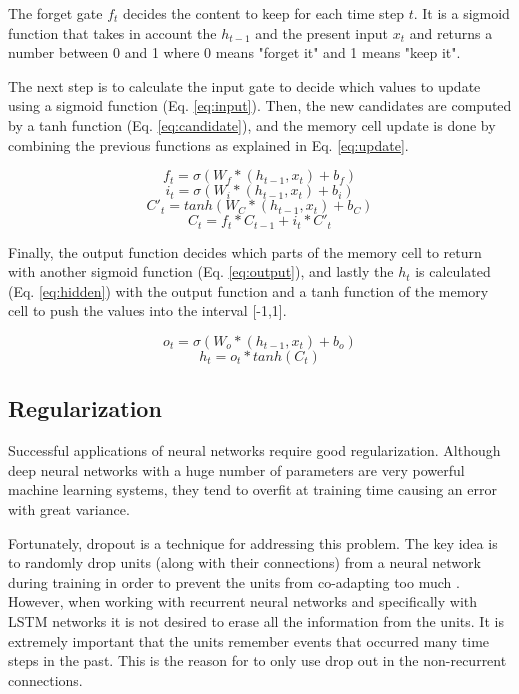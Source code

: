 The forget gate $f_t$ decides the content to keep for each time step $t$. It is a sigmoid function that takes in account the $h_{t-1}$ and the present input $x_t$ and returns a number between 0 and 1 where 0 means "forget it" and 1 means "keep it". 

The next step is to calculate the input gate to decide which values to update using a sigmoid function (Eq. \ref{eq:input}). Then, the new candidates are computed by a tanh function (Eq. \ref{eq:candidate}), and the memory cell update is done by combining the previous functions as explained in Eq. \ref{eq:update}.

\begin{equation} \label{eq:forget}
f_t=\sigma(W_f*(h_{t-1},x_t)+b_f)
\end{equation}
\begin{equation} \label{eq:input}
i_t=\sigma(W_i*(h_{t-1},x_t)+b_i)
\end{equation}
\begin{equation} \label{eq:candidate}
C'_t=tanh(W_C*(h_{t-1},x_t)+b_C)
\end{equation}
\begin{equation} \label{eq:update}
C_t=f_t*C_{t-1}+i_t*C'_t
\end{equation}

Finally, the output function decides which parts of the memory cell to return with another sigmoid function (Eq. \ref{eq:output}), and lastly the $h_t$ is calculated (Eq. \ref{eq:hidden}) with the output function and a tanh function of the memory cell to push the values into the interval [-1,1].

\begin{equation} \label{eq:output}
o_t=\sigma(W_o*(h_{t-1},x_t)+b_o)
\end{equation}
\begin{equation} \label{eq:hidden}
h_t=o_t*tanh(C_t)
\end{equation}

\subsection{Regularization}

Successful applications of neural networks require good regularization. Although deep neural networks with a huge number of parameters are very powerful machine learning systems, they tend to overfit at training time causing an error with great variance. 

Fortunately, dropout is a technique for addressing this problem. The key idea is to randomly drop units (along with their connections) from a neural network during training in order to prevent the units from co-adapting too much \cite{srivastava2013improving}. However, when working with recurrent neural networks and specifically with LSTM networks it is not desired to erase all the information from the units. It is extremely important that the units remember events that occurred many time steps in the past. This is the reason for \cite{zaremba2014recurrent} to only use drop out in the non-recurrent connections. 

